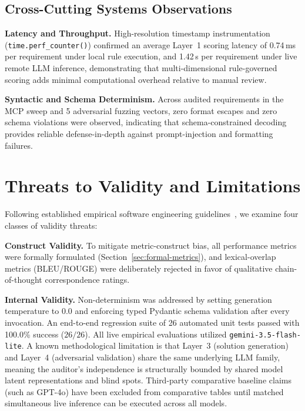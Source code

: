 \documentclass[journal]{IEEEtran}
\begin{document}
\subsection{Cross-Cutting Systems Observations}
\label{sec:discussion-crosscutting}

\textbf{Latency and Throughput.} High-resolution timestamp instrumentation (\texttt{time.perf\_counter()}) confirmed an average Layer~1 scoring latency of 0.74\,ms per requirement under local rule execution, and 1.42\,s per requirement under live remote LLM inference, demonstrating that multi-dimensional rule-governed scoring adds minimal computational overhead relative to manual review.

\textbf{Syntactic and Schema Determinism.} Across audited requirements in the MCP sweep and 5 adversarial fuzzing vectors, zero format escapes and zero schema violations were observed, indicating that schema-constrained decoding provides reliable defense-in-depth against prompt-injection and formatting failures.

\section{Threats to Validity and Limitations}
\label{sec:threats}

Following established empirical software engineering guidelines~\cite{wohlin2012experimentation}, we examine four classes of validity threats:

\textbf{Construct Validity.} To mitigate metric-construct bias, all performance metrics were formally formulated (Section~\ref{sec:formal-metrics}), and lexical-overlap metrics (BLEU/ROUGE) were deliberately rejected in favor of qualitative chain-of-thought correspondence ratings.

\textbf{Internal Validity.} Non-determinism was addressed by setting generation temperature to $0.0$ and enforcing typed Pydantic schema validation after every invocation. An end-to-end regression suite of 26 automated unit tests passed with 100.0\% success ($26/26$). All live empirical evaluations utilized \texttt{gemini-3.5-flash-lite}. A known methodological limitation is that Layer~3 (solution generation) and Layer~4 (adversarial validation) share the same underlying LLM family, meaning the auditor's independence is structurally bounded by shared model latent representations and blind spots. Third-party comparative baseline claims (such as GPT-4o) have been excluded from comparative tables until matched simultaneous live inference can be executed across all models.
\end{document}
